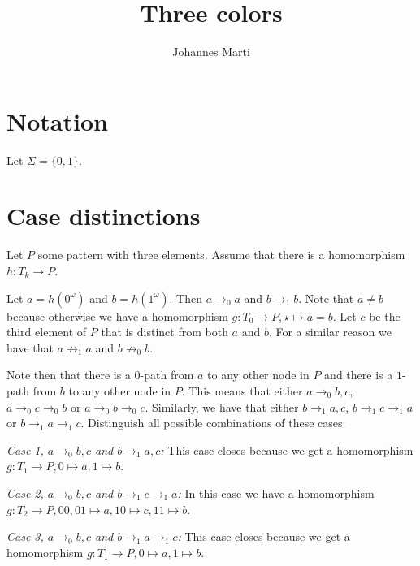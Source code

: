 \documentclass[a4paper]{article}
\title{Three colors}
\author{Johannes Marti}
\newcommand{\first}[1]{\mathsf{first}({#1})}
\newcommand{\last}[1]{\mathsf{last}({#1})}
\newcommand{\case}[2]{\vspace{1ex}\noindent\textit{Case #1, #2:}}
\begin{document}
\maketitle

\section{Notation}

Let $\Sigma = \{0,1\}$.

%

\section{Case distinctions}

Let $P$ some pattern with three elements. Assume that there is a
homomorphism $h : T_k \to P$.

Let $a = h(0^\omega)$ and $b = h(1^\omega)$. Then $a \rightarrow_0 a$
and $b \rightarrow_1 b$. Note that $a \neq b$ because otherwise we have
a homomorphism $g : T_0 \to P, \star \mapsto a=b$. Let $c$ be the third
element of $P$ that is distinct from both $a$ and $b$. For a similar
reason we have that $a \not \rightarrow_1 a$ and $b \not \rightarrow_0
b$.

Note then that there is a $0$-path from $a$ to any other node in $P$ and
there is a $1$-path from $b$ to any other node in $P$. This means that
either $a \rightarrow_0 b,c$, $a \rightarrow_0 c \rightarrow_0 b$ or $a
\rightarrow_0 b \rightarrow_0 c$. Similarly, we have that either $b
\rightarrow_1 a,c$, $b \rightarrow_1 c \rightarrow_1 a$ or $b
\rightarrow_1 a \rightarrow_1 c$. Distinguish all possible combinations
of these cases:

\case{1}{$a \rightarrow_0 b,c$ and $b \rightarrow_1 a,c$} This case
closes because we get a homomorphism $g : T_1 \to P, 0 \mapsto a, 1
\mapsto b$.

\case{2}{$a \rightarrow_0 b,c$ and $b \rightarrow_1 c \rightarrow_1 a$} 
In this case we have a homomorphism $g : T_2 \to P, 00,01 \mapsto a, 10
\mapsto c, 11 \mapsto b$.

\case{3}{$a \rightarrow_0 b,c$ and $b \rightarrow_1 a \rightarrow_1 c$}
This case closes because we get a homomorphism $g : T_1 \to P, 0 \mapsto
a, 1 \mapsto b$.
\end{document}
